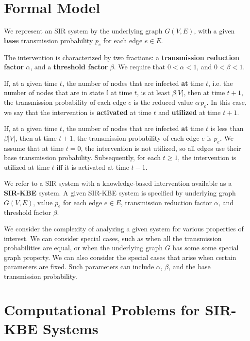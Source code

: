 \documentclass[11pt]{article}
\newcommand{\istate}{\mbox{$\mathbb{I}$}}
\begin{document}
\section{Formal Model}
\label{sec:formal_model}

We represent an SIR
system by the underlying graph $G(V,E)$, with
a given {\bf base} transmission probability $p_e$ for each edge $e \in E$. 
 
 The intervention is characterized by two fractions:
a {\bf transmission reduction factor} $\alpha$, 
and a {\bf threshold factor} $\beta$.
We require that $0 < \alpha <1$, and $0 < \beta <1$.

If, at a given time $t$, the number of nodes that are infected {\bf at} time $t$,
i.e. the number of nodes that are in state $\istate$ at time $t$,
 is at least $\beta |V|$,
then at time $t+1$, the transmission probability of each edge $e$ 
is the reduced value $\alpha \, p_e$.
In this case, 
we say that the intervention is {\bf activated} at time $t$ and {\bf utilized} at time $t+1$.

If, at a given time $t$, the number of nodes that are infected {\bf at} time $t$
is less than $\beta |V|$,
then at time $t+1$, the transmission probability of each edge $e$ is  $p_e$.
We assume that at time $t=0$, the intervention is not utilized, 
so all edges use their base transmission probability.
Subsequently, for each $t \geq 1$,
the intervention is utilized at time $t$ iff it is activated at time $t-1$.

We refer to a SIR system with a knowledge-based intervention available as a {\bf SIR-KBE} system.
A given SIR-KBE system is specified by underlying graph $G(V,E)$, 
value $p_e$ for each edge $e \in E$,
transmission reduction factor $\alpha$, and threshold factor $\beta$.



We consider the complexity of analyzing a given system for various properties of interest.
We can consider special cases, such as when all the transmission probabilities are equal,
or when the underlying graph $G$ has some some special graph property.
We can also consider the special cases that arise when certain parameters are fixed.
Such parameters can include $\alpha$, $\beta$, and the base transmission probability.

\section{Computational Problems for SIR-KBE Systems}
\label{sec:computational_problems}
\end{document}
